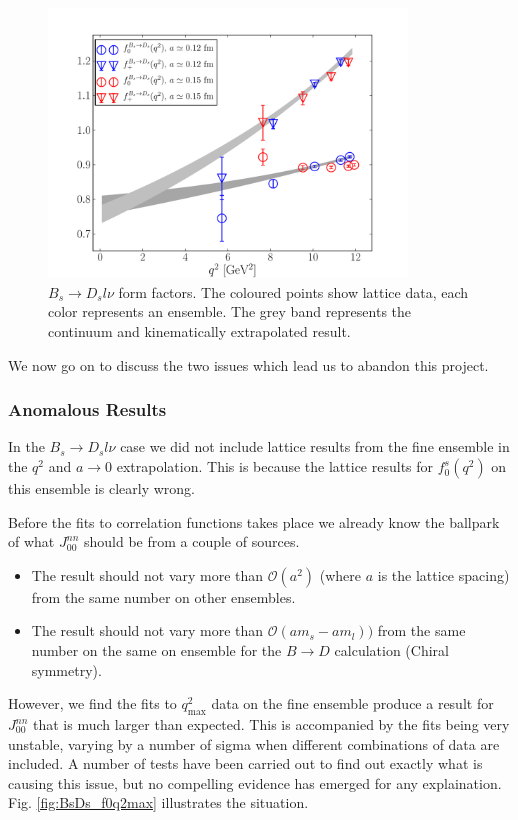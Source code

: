 \begin{figure}[htb!]
  \vspace{-20pt}
  \begin{center}
    \includegraphics[width=0.85\textwidth]{images/nrqcd/BsDs_formfactors.pdf}
  \end{center}
  \caption{$B_s\to D_sl\nu$ form factors. The coloured points show lattice data, each color represents an ensemble. The grey band represents the continuum and kinematically extrapolated result. \label{fig:BsDs_formfactors}}
  \vspace{-20pt}
\end{figure}

We now go on to discuss the two issues which lead us to abandon this project.

\subsubsection{Anomalous Results}

In the $B_s\to D_s l\nu$ case we did not include lattice results from the fine ensemble in the $q^2$ and $a\to 0$ extrapolation. This is because the lattice results for $f_0^s(q^2)$ on this ensemble is clearly wrong.

Before the fits to correlation functions takes place we already know the ballpark of what $J^{nn}_{00}$ should be from a couple of sources.
\begin{itemize}
\item
The result should not vary more than $\mathcal{O}(a^2)$ (where $a$ is the lattice spacing) from the same number on other ensembles.
\item
  The result should not vary more than $\mathcal{O}(am_s - am_l))$ from the same number on the same on ensemble for the $B\to D$ calculation (Chiral symmetry).
\end{itemize}
However, we find the fits to $q^2_{\text{max}}$ data on the fine ensemble produce a result for $J^{nn}_{00}$ that is much larger than expected. This is accompanied by the fits being very unstable, varying by a number of sigma when different combinations of data are included. A number of tests have been carried out to find out exactly what is causing this issue, but no compelling evidence has emerged for any explaination. Fig. \ref{fig:BsDs_f0q2max} illustrates the situation.

